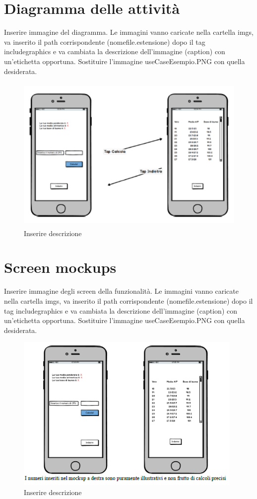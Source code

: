 \section{Diagramma delle attività}

Inserire immagine del diagramma. Le immagini vanno caricate nella cartella imgs, va inserito il path corrispondente (nomefile.estensione) dopo il tag includegraphics e va cambiata la descrizione dell'immagine (caption) con un'etichetta opportuna. Sostituire l'immagine useCaseEsempio.PNG con quella desiderata.

\begin{figure}[H]
	\centering
	\includegraphics[height=3in,width=5in]{imgs/ActivityDgEsempio.PNG}
	\caption{Inserire descrizione}
	\label{fig:prova}
\end{figure}

\section{Screen mockups}

Inserire immagine degli screen della funzionalità. Le immagini vanno caricate nella cartella imgs, va inserito il path corrispondente (nomefile.estensione) dopo il tag includegraphics e va cambiata la descrizione dell'immagine (caption) con un'etichetta opportuna. Sostituire l'immagine useCaseEsempio.PNG con quella desiderata.

\begin{figure}[H]
	\centering
	\includegraphics[height=3in]{imgs/MockupEsempio.PNG}
	\caption{Inserire descrizione}
	\label{fig:prova}
\end{figure}

\newpage